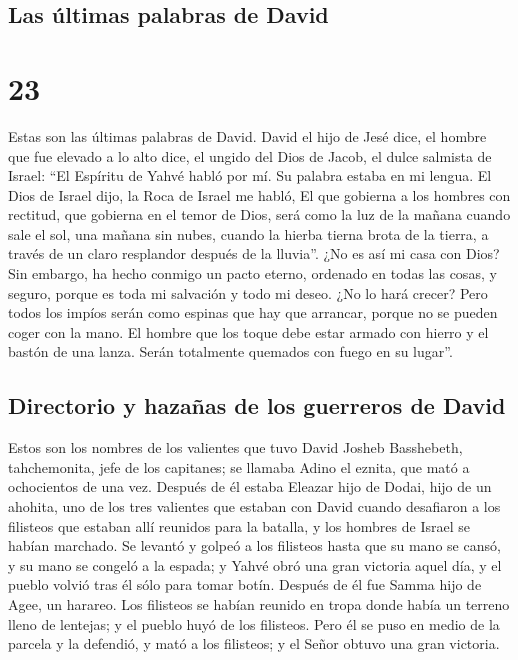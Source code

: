 \hypertarget{las-uxfaltimas-palabras-de-david}{%
\subsection{Las últimas palabras de
David}\label{las-uxfaltimas-palabras-de-david}}

\hypertarget{section-22}{%
\section{23}\label{section-22}}

 Estas son las últimas palabras de David. David el hijo de
Jesé dice, el hombre que fue elevado a lo alto dice, el ungido del Dios
de Jacob, el dulce salmista de Israel:  ``El Espíritu de
Yahvé habló por mí. Su palabra estaba en mi lengua.  El
Dios de Israel dijo, la Roca de Israel me habló, El que gobierna a los
hombres con rectitud, que gobierna en el temor de Dios, 
será como la luz de la mañana cuando sale el sol, una mañana sin nubes,
cuando la hierba tierna brota de la tierra, a través de un claro
resplandor después de la lluvia''.  ¿No es así mi casa con
Dios? Sin embargo, ha hecho conmigo un pacto eterno, ordenado en todas
las cosas, y seguro, porque es toda mi salvación y todo mi deseo. ¿No lo
hará crecer?  Pero todos los impíos serán como espinas que
hay que arrancar, porque no se pueden coger con la mano. 
El hombre que los toque debe estar armado con hierro y el bastón de una
lanza. Serán totalmente quemados con fuego en su lugar''.

\hypertarget{directorio-y-hazauxf1as-de-los-guerreros-de-david}{%
\subsection{Directorio y hazañas de los guerreros de
David}\label{directorio-y-hazauxf1as-de-los-guerreros-de-david}}

 Estos son los nombres de los valientes que tuvo David
Josheb Basshebeth, tahchemonita, jefe de los capitanes; se llamaba Adino
el eznita, que mató a ochocientos de una vez.  Después de
él estaba Eleazar hijo de Dodai, hijo de un ahohita, uno de los tres
valientes que estaban con David cuando desafiaron a los filisteos que
estaban allí reunidos para la batalla, y los hombres de Israel se habían
marchado.  Se levantó y golpeó a los filisteos hasta que
su mano se cansó, y su mano se congeló a la espada; y Yahvé obró una
gran victoria aquel día, y el pueblo volvió tras él sólo para tomar
botín.  Después de él fue Samma hijo de Agee, un harareo.
Los filisteos se habían reunido en tropa donde había un terreno lleno de
lentejas; y el pueblo huyó de los filisteos.  Pero él se
puso en medio de la parcela y la defendió, y mató a los filisteos; y el
Señor obtuvo una gran victoria.

